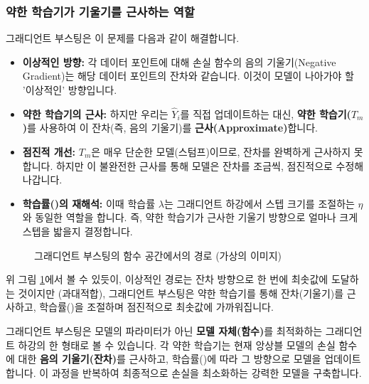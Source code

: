 \documentclass[11pt,a4paper]{article}
\theoremstyle{definition}
\begin{document}
\subsubsection{약한 학습기가 기울기를 근사하는 역할}
그래디언트 부스팅은 이 문제를 다음과 같이 해결합니다.
\begin{itemize}
    \item \textbf{이상적인 방향:} 각 데이터 포인트에 대해 손실 함수의 음의 기울기(Negative Gradient)는 해당 데이터 포인트의 잔차와 같습니다. 이것이 모델이 나아가야 할 '이상적인' 방향입니다.
    \item \textbf{약한 학습기의 근사:} 하지만 우리는 $\hat{Y}_i$를 직접 업데이트하는 대신, \textbf{약한 학습기($T_m$)}를 사용하여 이 잔차(즉, 음의 기울기)를 \textbf{근사(Approximate)}합니다.
    \item \textbf{점진적 개선:} $T_m$은 매우 단순한 모델(스텀프)이므로, 잔차를 완벽하게 근사하지 못합니다. 하지만 이 불완전한 근사를 통해 모델은 잔차를 조금씩, 점진적으로 수정해 나갑니다.
    \item \textbf{학습률(\texttt{\lambda})의 재해석:} 이때 학습률 $\lambda$는 그래디언트 하강에서 스텝 크기를 조절하는 $\eta$와 동일한 역할을 합니다. 즉, 약한 학습기가 근사한 기울기 방향으로 얼마나 크게 스텝을 밟을지 결정합니다.
\end{itemize}

\begin{figure}[h!]
    \centering
    \caption{그래디언트 부스팅의 함수 공간에서의 경로 (가상의 이미지)}
    \label{fig:gradient_boosting_path}
\end{figure}

위 그림 \ref{fig:gradient_boosting_path}에서 볼 수 있듯이, 이상적인 경로는 잔차 방향으로 한 번에 최솟값에 도달하는 것이지만 (과대적합), 그래디언트 부스팅은 약한 학습기를 통해 잔차(기울기)를 근사하고, 학습률(\texttt{\lambda})을 조절하며 점진적으로 최솟값에 가까워집니다.

\begin{tcolorbox}[summary, title={그래디언트 부스팅 = 함수 공간에서의 그래디언트 하강}] %
그래디언트 부스팅은 모델의 파라미터가 아닌 \textbf{모델 자체(함수)}를 최적화하는 그래디언트 하강의 한 형태로 볼 수 있습니다. 각 약한 학습기는 현재 앙상블 모델의 손실 함수에 대한 \textbf{음의 기울기(잔차)}를 근사하고, 학습률(\texttt{\lambda})에 따라 그 방향으로 모델을 업데이트합니다. 이 과정을 반복하여 최종적으로 손실을 최소화하는 강력한 모델을 구축합니다.
\end{tcolorbox}
\end{document}
